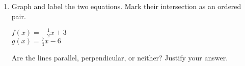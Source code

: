 \begin{enumerate}
\newpage
\item Graph and label the two equations. Mark their intersection as an ordered pair.
  \begin{multicols}{2}
    $f(x) = -\frac{1}{2}x+3$ \\
    $g(x) = \frac{7}{4}x-6$
  \end{multicols}  \vspace{1cm}
  Are the lines parallel, perpendicular, or neither? Justify your answer.
  \vspace{1.5cm}
  \begin{center}
  \end{center}


\end{enumerate}
